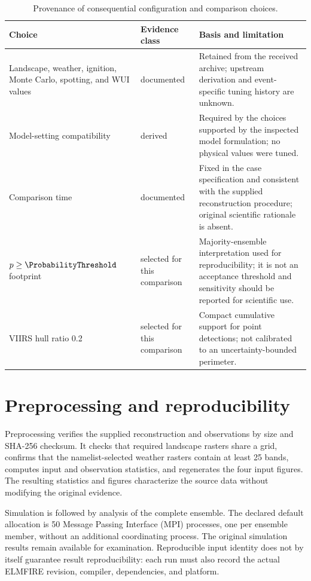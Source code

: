 \begin{table}[H]
\centering
\begin{tabular}{@{}p{}p{}p{}@{}}
\toprule
Choice & Evidence class & Basis and limitation \\
\midrule
Landscape, weather, ignition, Monte Carlo, spotting, and WUI values & documented & Retained from the received archive; upstream derivation and event-specific tuning history are unknown. \\
Model-setting compatibility & derived & Required by the choices supported by the inspected model formulation; no physical values were tuned. \\
Comparison time & documented & Fixed in the case specification and consistent with the supplied reconstruction procedure; original scientific rationale is absent. \\
$p\geq\ProbabilityThreshold$ footprint & selected for this comparison & Majority-ensemble interpretation used for reproducibility; it is not an acceptance threshold and sensitivity should be reported for scientific use. \\
VIIRS hull ratio 0.2 & selected for this comparison & Compact cumulative support for point detections; not calibrated to an uncertainty-bounded perimeter. \\
\bottomrule
\end{tabular}
\caption{Provenance of consequential configuration and comparison choices.}
\end{table}

\section{Preprocessing and reproducibility}

Preprocessing verifies the supplied reconstruction and observations by size
and SHA-256 checksum.  It checks that required landscape rasters share a grid, confirms that
the namelist-selected weather rasters contain at least 25 bands, computes input
and observation statistics, and regenerates the four input figures.  The resulting statistics and figures characterize the source data without
modifying the original evidence.

Simulation is followed by analysis of the complete ensemble. The declared
default allocation is 50 Message Passing Interface (MPI) processes, one per
ensemble member, without an additional coordinating process. The original
simulation results remain available for examination.  Reproducible input identity does not by itself guarantee result
reproducibility: each run must also record the actual ELMFIRE revision,
compiler, dependencies, and platform.

